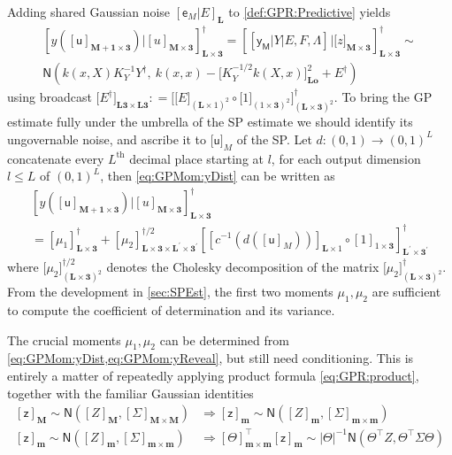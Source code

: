 \documentclass[preprint,12pt]{elsarticle}
\newcommand*{\M}[1]{\ensuremath{#1}\xspace}
\newcommand*{\x}{\times}
\newcommand*{\mi}[1]{\mathbf{#1}}
\newcommand*{\rv}[1]{\mathsf{#1}}
\newcommand*{\te}[2][]{\left\lbrack{#2}\right\rbrack_{#1}}
\newcommand*{\tte}[2][]{\lbrack{#2}\rbrack_{#1}}
\newcommand*{\deq}{\M{\mathrel{\mathop:}=}}
\newcommand*{\gauss}[2]{\mathsf{N}\!\left({#1,#2}\right)}
\newcommand*{\modulus}[1]{\M{\left\lvert{#1}\right\rvert}}
\begin{document}
    Adding shared Gaussian noise $\te[\mi{L}]{\rv{e}_M\vert E}$ to \cref{def:GPR:Predictive} yields
    \begin{multline}\label{eq:GPMom:yDist}
        \te[\mi{L\x 3}]{y(\te[\mi{M+1\x 3}]{\rv{u}}) \big\vert \te[\mi{M\x 3}]{u}}^{\dagger} 
        = \te[\mi{L\x 3}]{\te{\rv{y_M} \vert Y \vert E,F,\Lambda} \big\vert \tte[\mi{M\x 3}]{z}}^{\dagger} \sim \\
        \gauss{k(x,X) K_{Y}^{-1} Y^{\dagger}}{\ k(x,x) - \tte[\mi{Lo}]{K_{Y}^{-1/2} k(X,x)}^{2} + E^{\dagger}}
    \end{multline}
    using broadcast $\tte[\mi{L3\x L3}]{E^{\dagger}} \deq \tte[(\mi{L\x 3})^{2}]{\tte[(\mi{L}\x 1)^{2}]{E} \circ \tte[(1\x\mi{3})^{2}]{1}}^{\dagger}$. 
    To bring the GP estimate fully under the umbrella of the SP estimate we should identify its ungovernable noise, and ascribe it to $\tte[M]{\rv{u}}$ of the SP.
    Let $d\colon (0,1) \to (0,1)^{L}$ concatenate every $L^{\mathrm{th}}$ decimal place starting at $l$, for each output dimension $l\leq L$ of $(0,1)^{L}$, then \cref{eq:GPMom:yDist} can be written as
    \begin{multline}\label{eq:GPMom:yReveal}
        \te[\mi{L\x 3}]{y(\te[\mi{M+1\x 3}]{\rv{u}}) \big\vert \te[\mi{M\x 3}]{u}}^{\dagger} \\
        = \te[\mi{L\x 3}]{\mu_{1}}^{\dagger}
        + \te[\mi{L\x 3\x L^{\prime}\x 3^{\prime}}]{\mu_{2}}^{\dagger/2} \te[\mi{L^{\prime}\x 3^{\prime}}]{\te[\mi{L}\x 1]{c^{-1}\!\left(d\left(\te[M]{\rv{u}}\right)\right)} \circ \te[1\x\mi{3}]{1}}^{\dagger}
    \end{multline}
    where $\tte[(\mi{L\x 3})^{2}]{\mu_{2}}^{\dagger/2}$ denotes the Cholesky decomposition of the matrix $\tte[(\mi{L\x 3})^{2}]{\mu_{2}}^{\dagger}$.
    From the development in \cref{sec:SPEst}, the first two moments $\mu_{1},\mu_{2}$ are sufficient to compute the coefficient of determination and its variance. 
    
    The crucial moments $\mu_{1},\mu_{2}$ can be determined from \cref{eq:GPMom:yDist,eq:GPMom:yReveal}, but still need conditioning. This is entirely a matter of repeatedly applying product formula \cref{eq:GPR:product}, together with the familiar Gaussian identities
    \begin{equation*}
        \begin{aligned}
            \te[\mi{M}]{\rv{z}} \sim \gauss{\te[\mi{M}]{Z}}{\te[\mi{M}\x\mi{M}]{\Sigma}} &\Rightarrow
            \te[\mi{m}]{\rv{z}} \sim \gauss{\te[\mi{m}]{Z}}{\te[\mi{m}\x\mi{m}]{\Sigma}} \\
            \te[\mi{m}]{\rv{z}} \sim \gauss{\te[\mi{m}]{Z}}{\te[\mi{m}\x\mi{m}]{\Sigma}} &\Rightarrow
            \te[\mi{m}\x\mi{m}]{\Theta}^{\intercal}\te[\mi{m}]{\rv{z}} \sim 
            \modulus{\Theta}^{-1}
            \gauss{\Theta^{\intercal}Z}{\Theta^{\intercal}\Sigma\Theta}                        
        \end{aligned}
    \end{equation*}
\end{document}
